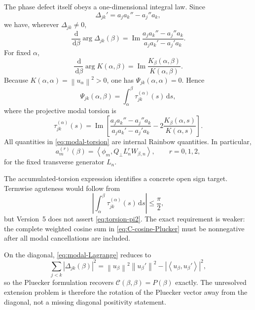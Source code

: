 \documentclass[11pt]{amsart}
\numberwithin{equation}{section}
\theoremstyle{plain}
\theoremstyle{definition}
\theoremstyle{remark}
\newcommand{\Ccal}{\mathcal C}
\newcommand{\Imm}{\operatorname{Im}}
\newcommand{\dd}{\,\mathrm d}
\newcommand{\ip}[2]{\left\langle #1,#2\right\rangle}
\newcommand{\norm}[1]{\left\lVert #1\right\rVert}
\begin{document}
The phase defect itself obeys a one-dimensional integral law.  Since
\begin{equation}
\Delta_{jk}'
=a_j a_k''-a_j''a_k,
\label{eq:Delta-prime}
\end{equation}
we have, wherever \(\Delta_{jk}\ne0\),
\begin{equation}
\frac{\dd}{\dd\beta}\arg\Delta_{jk}(\beta)
=
\Imm\frac{a_j a_k''-a_j''a_k}{a_j a_k'-a_j'a_k}.
\label{eq:arg-Delta-prime}
\end{equation}
For fixed \(\alpha\),
\begin{equation}
\frac{\dd}{\dd\beta}\arg K(\alpha,\beta)
=
\Imm\frac{K_\beta(\alpha,\beta)}{K(\alpha,\beta)}.
\label{eq:arg-K-prime}
\end{equation}
Because \(K(\alpha,\alpha)=\norm{u_\alpha}^2>0\), one has \(\Psi_{jk}(\alpha,\alpha)=0\).  Hence
\begin{equation}
\boxed{
\Psi_{jk}(\alpha,\beta)
=
\int_\alpha^\beta
\tau_{jk}^{(\alpha)}(s)\dd s,
}
\label{eq:Psi-torsion-integral}
\end{equation}
where the projective modal torsion is
\begin{equation}
\boxed{
\tau_{jk}^{(\alpha)}(s)
=
\Imm\left[
\frac{a_j a_k''-a_j''a_k}{a_j a_k'-a_j'a_k}
-
2\frac{K_\beta(\alpha,s)}{K(\alpha,s)}
\right].
}
\label{eq:modal-torsion}
\end{equation}
All quantities in \eqref{eq:modal-torsion} are internal Rainbow quantities.  In particular,
\begin{equation}
a_m^{(r)}(\beta)
=
\ip{\phi_m}{Q_\perp L_n^r W_{\beta,n}},
\qquad r=0,1,2,
\label{eq:modal-L-powers}
\end{equation}
for the fixed transverse generator \(L_n\).

The accumulated-torsion expression identifies a concrete open sign target.  Termwise aguteness would follow from
\begin{equation}
\left|
\int_\alpha^\beta
\tau_{jk}^{(\alpha)}(s)\dd s
\right|\le\frac\pi2,
\label{eq:torsion-pi2}
\end{equation}
but Version~5 does not assert \eqref{eq:torsion-pi2}.  The exact requirement is weaker: the complete weighted cosine sum in \eqref{eq:C-cosine-Plucker} must be nonnegative after all modal cancellations are included.

On the diagonal, \eqref{eq:modal-Lagrange} reduces to
\begin{equation}
\boxed{
\sum_{j<k}|\Delta_{jk}(\beta)|^2
=
\norm{u_\beta}^2\norm{u_\beta'}^2
-
|\ip{u_\beta}{u_\beta'}|^2,
}
\label{eq:diagonal-Plucker-sum}
\end{equation}
so the Pluecker formulation recovers \(\Ccal(\beta,\beta)=P(\beta)\) exactly.  The unresolved extension problem is therefore the rotation of the Pluecker vector away from the diagonal, not a missing diagonal positivity statement.
\end{document}
